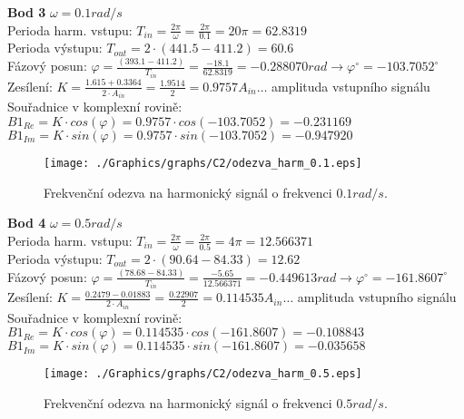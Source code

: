 \documentclass{article}
\begin{document}
			\noindent
			\textbf{Bod 3 }$\omega=0.1 rad/s$\\
			Perioda harm. vstupu: \(T_{in}=\frac{2\pi}{\omega}=\frac{2\pi}{0.1}=20\pi=62.8319\)\\
			Perioda výstupu: \(T_{out}=2\cdot(441.5-411.2)=60.6\)\\
			Fázový posun: \(\varphi=\frac{(393.1-411.2)}{T_{in}}=\frac{-18.1}{62.8319}=-0.288070 rad\rightarrow \varphi^{\circ}=-103.7052^{\circ}\)\\
			Zesílení: \(K=\frac{1.615+0.3364}{2\cdot A_{in}}=\frac{1.9514}{2}=0.9757\)\hspace{1cm}\(A_{in}\dots\) amplituda vstupního signálu\\
			Souřadnice v komplexní rovině:\\
			\(B1_{Re}=K\cdot cos(\varphi)=0.9757\cdot cos(-103.7052)=-0.231169\)\\
			\(B1_{Im}=K\cdot sin(\varphi)=0.9757\cdot sin(-103.7052)=-0.947920\)
			\begin{figure}[H]
				\centering
				\texttt{[image: ./Graphics/graphs/C2/odezva\_harm\_0.1.eps]}
				\caption{Frekvenční odezva na harmonický signál o frekvenci \(0.1 rad/s\).}
				\label{pic:bod3}
			\end{figure}
			\noindent
			\textbf{Bod 4 }$\omega=0.5 rad/s$\\
			Perioda harm. vstupu: \(T_{in}=\frac{2\pi}{\omega}=\frac{2\pi}{0.5}=4\pi=12.566371\)\\
			Perioda výstupu: \(T_{out}=2\cdot(90.64-84.33)=12.62\)\\
			Fázový posun: \(\varphi=\frac{(78.68-84.33)}{T_{in}}=\frac{-5.65}{12.566371}=-0.449613 rad\rightarrow \varphi^{\circ}=-161.8607^{\circ}\)\\
			Zesílení: \(K=\frac{0.2479-0.01883}{2\cdot A_{in}}=\frac{0.22907}{2}=0.114535\)\hspace{1cm}\(A_{in}\dots\) amplituda vstupního signálu\\
			Souřadnice v komplexní rovině:\\
			\(B1_{Re}=K\cdot cos(\varphi)=0.114535\cdot cos(-161.8607)=-0.108843\)\\
			\(B1_{Im}=K\cdot sin(\varphi)=0.114535\cdot sin(-161.8607)=-0.035658\)
			\begin{figure}[H]
				\centering
				\texttt{[image: ./Graphics/graphs/C2/odezva\_harm\_0.5.eps]}
				\caption{Frekvenční odezva na harmonický signál o frekvenci \(0.5 rad/s\).}
				\label{pic:bod4}
			\end{figure}
\end{document}
